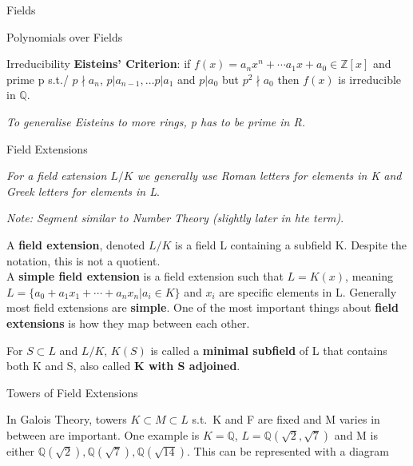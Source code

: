 \documentclass[12pt, letterpaper]{article}
\begin{document}
\begin{section}{Fields}
\begin{subsection}{Polynomials over Fields}
\begin{subsubsection}{Irreducibility}
      \textbf{Eisteins' Criterion}: if \(f(x) = a_{n}x^{n} + \cdots a_{1}x +
      a_{0} \in \mathbb{Z}[x]\) and prime p s.t./ \(p \nmid a_{n}\),
      \(p | a_{n - 1}, \dots p | a_{1}\) and \(p | a_{0}\) but \(p^{2} \nmid
      a_{0}\) then \(f(x)\) is irreducible in \(\mathbb{Q}\).

      \textit{To generalise Eisteins to more rings, p has to be prime in R.}

    \end{subsubsection}

  \end{subsection}

  \begin{subsection}{Field Extensions}

    \textit{For a field extension \(L / K\) we generally use Roman letters for
      elements in K and Greek letters for elements in L}.

    \textit{Note: Segment similar to Number Theory (slightly later in hte
      term)}.

    A \textbf{field extension}, denoted \(L / K\) is a field L containing a
    subfield K. Despite the notation, this is not a quotient. \\
    A \textbf{simple field extension} is a field extension such that
    \(L = K(x)\), meaning \(L = \{a_{0} + a_{1}x_{1} + \cdots + a_{n}x_{n}
    | a_{i} \in K\}{}\) and \(x_{i}\) are specific elements in L. Generally
    most field extensions are \textbf{simple}. One of the most important things
    about \textbf{field extensions} is how they map between each other.

    For \(S \subset L\) and \(L / K\), \(K(S)\) is called a \textbf{minimal
      subfield} of L that contains both K and S, also called \textbf{K with
      S adjoined}.

    \begin{subsubsection}{Towers of Field Extensions}

      In Galois Theory, towers \(K \subset M \subset L\) s.t.\ K and F are
      fixed and M varies in between are important. One example is \(K =
      \mathbb{Q}\), \(L = \mathbb{Q}(\sqrt{2}, \sqrt{7})\) and M is either
      \(\mathbb{Q}(\sqrt{2}), \mathbb{Q}(\sqrt{7}), \mathbb{Q}(\sqrt{14})\).
      This can be represented with a diagram
      \begin{center}
\end{center}
\end{subsubsection}
\end{subsection}
\end{section}
\end{document}
